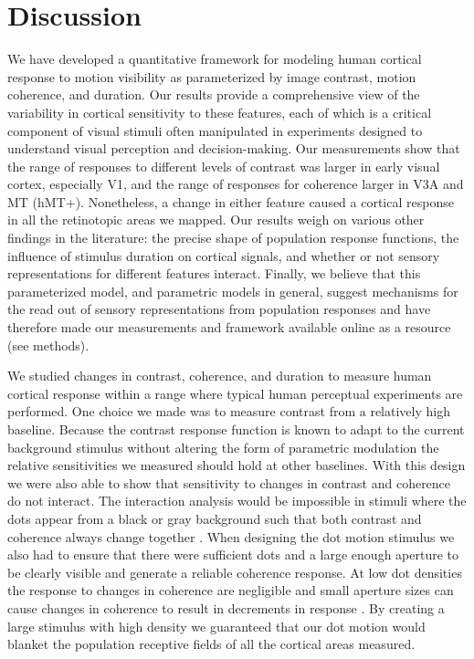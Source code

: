 \section{Discussion}

We have developed a quantitative framework for modeling human cortical response to motion visibility as parameterized by image contrast, motion coherence, and duration. Our results provide a comprehensive view of the variability in cortical sensitivity to these features, each of which is a critical component of visual stimuli often manipulated in experiments designed to understand visual perception and decision-making. Our measurements show that the range of responses to different levels of contrast was larger in early visual cortex, especially V1, and the range of responses for coherence larger in V3A and MT (hMT+). Nonetheless, a change in either feature caused a cortical response in all the retinotopic areas we mapped. Our results weigh on various other findings in the literature: the precise shape of population response functions, the influence of stimulus duration on cortical signals, and whether or not sensory representations for different features interact. Finally, we believe that this parameterized model, and parametric models in general, suggest mechanisms for the read out of sensory representations from population responses and have therefore made our measurements and framework available online as a resource (see methods).

We studied changes in contrast, coherence, and duration to measure human cortical response within a range where typical human perceptual experiments are performed. One choice we made was to measure contrast from a relatively high baseline. Because the contrast response function is known to adapt to the current background stimulus without altering the form of parametric modulation \citep{Ohzawa1982-dy,Ohzawa1985-gg,Sclar1985-bu,Sclar1989-ty,Gardner2005-pg} the relative sensitivities we measured should hold at other baselines. With this design we were also able to show that sensitivity to changes in contrast and coherence do not interact. The interaction analysis would be impossible in stimuli where the dots appear from a black or gray background such that both contrast and coherence always change together \citep{Britten1993-oh,Rees2000-ul}. When designing the dot motion stimulus we also had to ensure that there were sufficient dots and a large enough aperture to be clearly visible and generate a reliable coherence response. At low dot densities the response to changes in coherence are negligible \citep{Smith2006-cb} and small aperture sizes can cause changes in coherence to result in decrements in response \citep{Ajina2015-xm,Becker2008-uj,Costagli2014-kg}. By creating a large stimulus with high density we guaranteed that our dot motion would blanket the population receptive fields of all the cortical areas measured.

